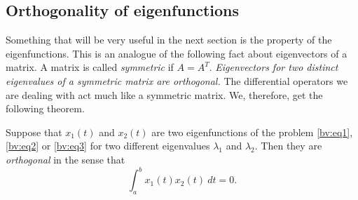\documentclass[12pt]{book}
\begin{document}
\subsection{Orthogonality of eigenfunctions}

Something that will be very useful in the next section is the
\emph{} property of the eigenfunctions. This is an analogue
of the following fact about eigenvectors of a matrix.  A matrix is
called
\emph{symmetric}
if $A = A^T$.
\emph{Eigenvectors for two distinct eigenvalues of a symmetric
matrix are orthogonal.}
The
differential operators we are dealing with act much like a symmetric matrix.
We, therefore, get the following theorem.

%
%
%

\begin{theorem}
Suppose that $x_1(t)$ and $x_2(t)$ are two eigenfunctions of the problem
\eqref{bv:eq1}, \eqref{bv:eq2} or \eqref{bv:eq3}
for two different
eigenvalues $\lambda_1$ and $\lambda_2$.  Then they are
\emph{orthogonal}
in the sense that
\begin{equation*}
\int_a^b x_1(t) x_2(t) ~dt = 0 .
\end{equation*}
\end{theorem}
\end{document}
